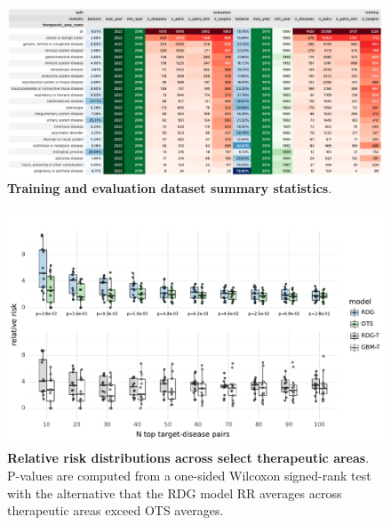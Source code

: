 \documentclass{article}
\begin{document}
\begin{figure}
  \centering
  \captionsetup{width=.9\linewidth}
  \includegraphics[width=1\textwidth]{dataset_statistics.png}
  \caption{
    \textbf{Training and evaluation dataset summary statistics}.
  }
  \label{fig:dataset_statistics}
\end{figure}
  
\begin{figure}
  \centering
  \captionsetup{width=.9\linewidth}
  \includegraphics[width=1\textwidth]{relative_risk_dist_across_ta.pdf}
  \caption{
    \textbf{Relative risk distributions across select therapeutic areas}.
    P-values are computed from a one-sided Wilcoxon signed-rank test with the alternative that the RDG model RR averages across therapeutic areas exceed OTS averages.
  }
  \label{fig:relative_risk_dist_across_ta}
\end{figure}
\end{document}
